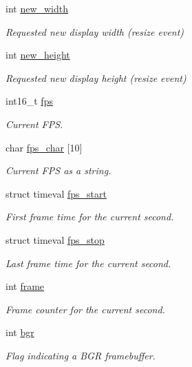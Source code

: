 \begin{DoxyCompactItemize}
int \mbox{\hyperlink{struct__fbg_a95859bd418a5cfff155cdb1421d295ef}{new\+\_\+width}}
\begin{DoxyCompactList}\small\item\em Requested new display width (resize event) \end{DoxyCompactList}\item 
int \mbox{\hyperlink{struct__fbg_a509aa5f8f0a94d8313bb4da777aa64bc}{new\+\_\+height}}
\begin{DoxyCompactList}\small\item\em Requested new display height (resize event) \end{DoxyCompactList}\item 
int16\+\_\+t \mbox{\hyperlink{struct__fbg_a64b16363bc48d1e19141df2e242930a9}{fps}}
\begin{DoxyCompactList}\small\item\em Current F\+PS. \end{DoxyCompactList}\item 
char \mbox{\hyperlink{struct__fbg_af447e6ed58d893989c8dad075807a79b}{fps\+\_\+char}} \mbox{[}10\mbox{]}
\begin{DoxyCompactList}\small\item\em Current F\+PS as a string. \end{DoxyCompactList}\item 
struct timeval \mbox{\hyperlink{struct__fbg_a07d7bb827a7595c956fe22c2d65bba33}{fps\+\_\+start}}
\begin{DoxyCompactList}\small\item\em First frame time for the current second. \end{DoxyCompactList}\item 
struct timeval \mbox{\hyperlink{struct__fbg_ade17a45bbc82bef326857c2837cdf66c}{fps\+\_\+stop}}
\begin{DoxyCompactList}\small\item\em Last frame time for the current second. \end{DoxyCompactList}\item 
int \mbox{\hyperlink{struct__fbg_aa3ef83f919d12e680f8c64006b441454}{frame}}
\begin{DoxyCompactList}\small\item\em Frame counter for the current second. \end{DoxyCompactList}\item 
int \mbox{\hyperlink{struct__fbg_a5844c5bf4789117cbc0c972ff160b338}{bgr}}
\begin{DoxyCompactList}\small\item\em Flag indicating a B\+GR framebuffer. \end{DoxyCompactList}\item 

\end{DoxyCompactItemize}
